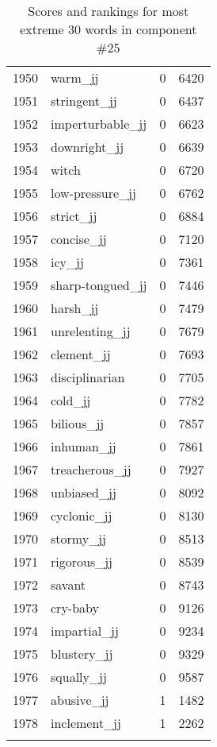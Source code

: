 \begin{longtable}[!htbp]{| rlr@{.}l |}
    1950 & warm\_jj & 0 & 6420 \\
    1951 & stringent\_jj & 0 & 6437 \\
    1952 & imperturbable\_jj & 0 & 6623 \\
    1953 & downright\_jj & 0 & 6639 \\
    1954 & witch & 0 & 6720 \\
    1955 & low-pressure\_jj & 0 & 6762 \\
    1956 & strict\_jj & 0 & 6884 \\
    1957 & concise\_jj & 0 & 7120 \\
    1958 & icy\_jj & 0 & 7361 \\
    1959 & sharp-tongued\_jj & 0 & 7446 \\
    1960 & harsh\_jj & 0 & 7479 \\
    1961 & unrelenting\_jj & 0 & 7679 \\
    1962 & clement\_jj & 0 & 7693 \\
    1963 & disciplinarian & 0 & 7705 \\
    1964 & cold\_jj & 0 & 7782 \\
    1965 & bilious\_jj & 0 & 7857 \\
    1966 & inhuman\_jj & 0 & 7861 \\
    1967 & treacherous\_jj & 0 & 7927 \\
    1968 & unbiased\_jj & 0 & 8092 \\
    1969 & cyclonic\_jj & 0 & 8130 \\
    1970 & stormy\_jj & 0 & 8513 \\
    1971 & rigorous\_jj & 0 & 8539 \\
    1972 & savant & 0 & 8743 \\
    1973 & cry-baby & 0 & 9126 \\
    1974 & impartial\_jj & 0 & 9234 \\
    1975 & blustery\_jj & 0 & 9329 \\
    1976 & squally\_jj & 0 & 9587 \\
    1977 & abusive\_jj & 1 & 1482 \\
    1978 & inclement\_jj & 1 & 2262 \\
    \hline
    \caption{Scores and rankings for most extreme 30 words in component \#25} \\
\end{longtable}
